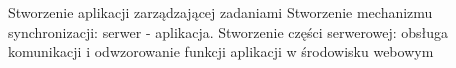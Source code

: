 

Stworzenie aplikacji zarządzającej zadaniami
Stworzenie mechanizmu synchronizacji: serwer - aplikacja.
Stworzenie części serwerowej: obsługa komunikacji i odwzorowanie funkcji aplikacji w środowisku webowym
